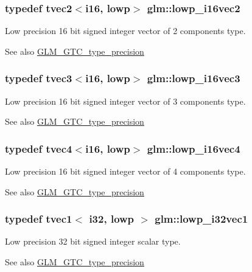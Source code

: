 \subsubsection[{lowp\+\_\+i16vec2}]{\setlength{\rightskip}{0pt plus 5cm}typedef tvec2$<${\bf i16}, lowp$>$ {\bf glm\+::lowp\+\_\+i16vec2}}\label{namespaceglm_aaa886fe5fe83a35f45959eb90f73ba17}
Low precision 16 bit signed integer vector of 2 components type. \begin{DoxySeeAlso}{See also}
\hyperlink{group__gtc__type__precision}{G\+L\+M\+\_\+\+G\+T\+C\+\_\+type\+\_\+precision} 
\end{DoxySeeAlso}
\hypertarget{namespaceglm_a0129c7acf0bf10176de2b14dce1b75a4}{}
\subsubsection[{lowp\+\_\+i16vec3}]{\setlength{\rightskip}{0pt plus 5cm}typedef tvec3$<${\bf i16}, lowp$>$ {\bf glm\+::lowp\+\_\+i16vec3}}\label{namespaceglm_a0129c7acf0bf10176de2b14dce1b75a4}
Low precision 16 bit signed integer vector of 3 components type. \begin{DoxySeeAlso}{See also}
\hyperlink{group__gtc__type__precision}{G\+L\+M\+\_\+\+G\+T\+C\+\_\+type\+\_\+precision} 
\end{DoxySeeAlso}
\hypertarget{namespaceglm_a2b67d6527ade6fa80ecdec107dbe3131}{}
\subsubsection[{lowp\+\_\+i16vec4}]{\setlength{\rightskip}{0pt plus 5cm}typedef tvec4$<${\bf i16}, lowp$>$ {\bf glm\+::lowp\+\_\+i16vec4}}\label{namespaceglm_a2b67d6527ade6fa80ecdec107dbe3131}
Low precision 16 bit signed integer vector of 4 components type. \begin{DoxySeeAlso}{See also}
\hyperlink{group__gtc__type__precision}{G\+L\+M\+\_\+\+G\+T\+C\+\_\+type\+\_\+precision} 
\end{DoxySeeAlso}
\hypertarget{namespaceglm_af3b9729c4b7d505368fd4ae20424b6d3}{}
\subsubsection[{lowp\+\_\+i32vec1}]{\setlength{\rightskip}{0pt plus 5cm}typedef tvec1$<$ {\bf i32}, lowp $>$ {\bf glm\+::lowp\+\_\+i32vec1}}\label{namespaceglm_af3b9729c4b7d505368fd4ae20424b6d3}
Low precision 32 bit signed integer scalar type. \begin{DoxySeeAlso}{See also}
\hyperlink{group__gtc__type__precision}{G\+L\+M\+\_\+\+G\+T\+C\+\_\+type\+\_\+precision} 
\end{DoxySeeAlso}
\hypertarget{namespaceglm_a9212b569bc55c19da61025470e90a906}{}
